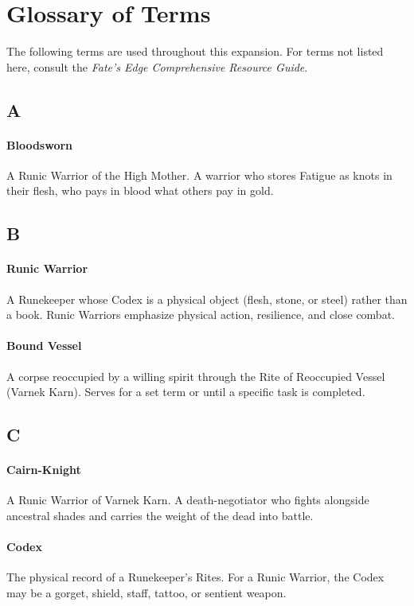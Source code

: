 \section{Glossary of Terms}

The following terms are used throughout this expansion. For terms not listed here, consult the \textit{Fate's Edge Comprehensive Resource Guide}.

\subsection*{A}

\paragraph{Bloodsworn}
A Runic Warrior of the High Mother. A warrior who stores Fatigue as knots in their flesh, who pays in blood what others pay in gold.

\subsection*{B}

\paragraph{Runic Warrior}
A Runekeeper whose Codex is a physical object (flesh, stone, or steel) rather than a book. Runic Warriors emphasize physical action, resilience, and close combat.

\paragraph{Bound Vessel}
A corpse reoccupied by a willing spirit through the Rite of Reoccupied Vessel (Varnek Karn). Serves for a set term or until a specific task is completed.

\subsection*{C}

\paragraph{Cairn-Knight}
A Runic Warrior of Varnek Karn. A death-negotiator who fights alongside ancestral shades and carries the weight of the dead into battle.

\paragraph{Codex}
The physical record of a Runekeeper's Rites. For a Runic Warrior, the Codex may be a gorget, shield, staff, tattoo, or sentient weapon.

